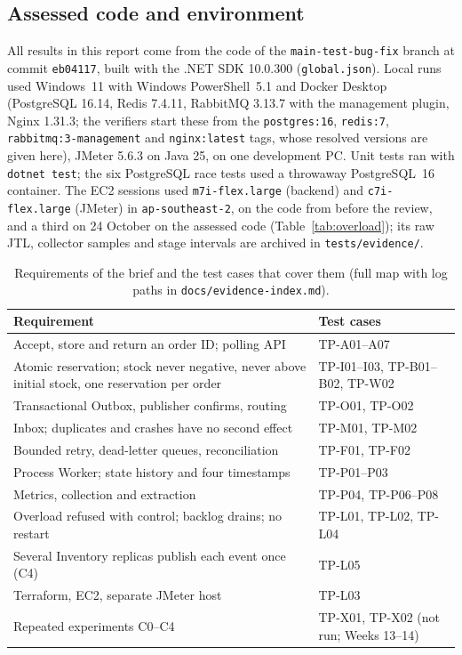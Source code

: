 \documentclass[12pt,a4paper]{article}
\begin{document}
\subsection{Assessed code and environment}
All results in this report come from the code of the
\texttt{main-test-bug-fix} branch at commit \texttt{eb04117}, built with the .NET SDK 10.0.300
(\texttt{global.json}). Local runs used Windows~11 with Windows PowerShell~5.1
and Docker Desktop (PostgreSQL 16.14, Redis 7.4.11, RabbitMQ 3.13.7 with the
management plugin, Nginx 1.31.3; the verifiers start these from the
\texttt{postgres:16}, \texttt{redis:7}, \texttt{rabbitmq:3-management} and
\texttt{nginx:latest} tags, whose resolved versions are given here), JMeter
5.6.3 on Java 25, on one development PC. Unit tests ran
with \texttt{dotnet test}; the six PostgreSQL race tests used a throwaway
PostgreSQL~16 container. The EC2 sessions used \texttt{m7i-flex.large}
(backend) and \texttt{c7i-flex.large} (JMeter) in \texttt{ap-southeast-2}, on
the code from before the review, and a third on 24 October on the assessed
code (Table~\ref{tab:overload}); its raw JTL, collector samples and stage
intervals are archived in \texttt{tests/evidence/}.

\begin{table}[H]
\centering\small
\caption{Requirements of the brief and the test cases that cover them (full
map with log paths in \texttt{docs/evidence-index.md}).}
\label{tab:req}
\begin{tabularx}{\textwidth}{YY}
\toprule
Requirement & Test cases \\
\midrule
Accept, store and return an order ID; polling API & TP-A01--A07 \\
Atomic reservation; stock never negative, never above initial stock, one
reservation per order & TP-I01--I03, TP-B01--B02, TP-W02 \\
Transactional Outbox, publisher confirms, routing & TP-O01, TP-O02 \\
Inbox; duplicates and crashes have no second effect & TP-M01, TP-M02 \\
Bounded retry, dead-letter queues, reconciliation & TP-F01, TP-F02 \\
Process Worker; state history and four timestamps & TP-P01--P03 \\
Metrics, collection and extraction & TP-P04, TP-P06--P08 \\
Overload refused with control; backlog drains; no restart & TP-L01, TP-L02, TP-L04 \\
Several Inventory replicas publish each event once (C4) & TP-L05 \\
Terraform, EC2, separate JMeter host & TP-L03 \\
Repeated experiments C0--C4 & TP-X01, TP-X02 (not run; Weeks 13--14) \\
\bottomrule
\end{tabularx}
\end{table}
\end{document}
